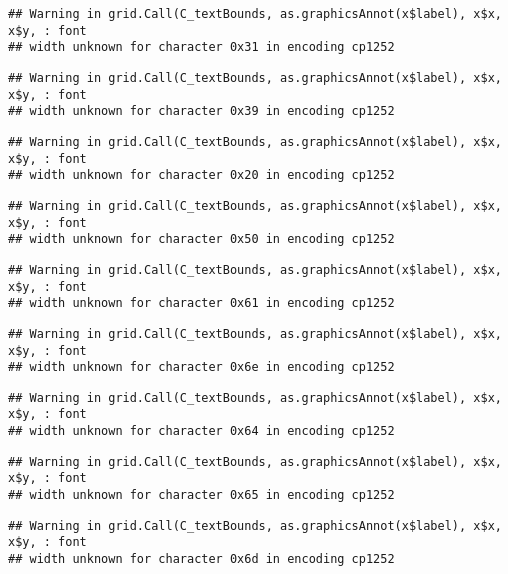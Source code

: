 \documentclass[
]{article}
\begin{document}
\begin{verbatim}
## Warning in grid.Call(C_textBounds, as.graphicsAnnot(x$label), x$x, x$y, : font
## width unknown for character 0x31 in encoding cp1252
\end{verbatim}

\begin{verbatim}
## Warning in grid.Call(C_textBounds, as.graphicsAnnot(x$label), x$x, x$y, : font
## width unknown for character 0x39 in encoding cp1252
\end{verbatim}

\begin{verbatim}
## Warning in grid.Call(C_textBounds, as.graphicsAnnot(x$label), x$x, x$y, : font
## width unknown for character 0x20 in encoding cp1252
\end{verbatim}

\begin{verbatim}
## Warning in grid.Call(C_textBounds, as.graphicsAnnot(x$label), x$x, x$y, : font
## width unknown for character 0x50 in encoding cp1252
\end{verbatim}

\begin{verbatim}
## Warning in grid.Call(C_textBounds, as.graphicsAnnot(x$label), x$x, x$y, : font
## width unknown for character 0x61 in encoding cp1252
\end{verbatim}

\begin{verbatim}
## Warning in grid.Call(C_textBounds, as.graphicsAnnot(x$label), x$x, x$y, : font
## width unknown for character 0x6e in encoding cp1252
\end{verbatim}

\begin{verbatim}
## Warning in grid.Call(C_textBounds, as.graphicsAnnot(x$label), x$x, x$y, : font
## width unknown for character 0x64 in encoding cp1252
\end{verbatim}

\begin{verbatim}
## Warning in grid.Call(C_textBounds, as.graphicsAnnot(x$label), x$x, x$y, : font
## width unknown for character 0x65 in encoding cp1252
\end{verbatim}

\begin{verbatim}
## Warning in grid.Call(C_textBounds, as.graphicsAnnot(x$label), x$x, x$y, : font
## width unknown for character 0x6d in encoding cp1252
\end{verbatim}
\end{document}
